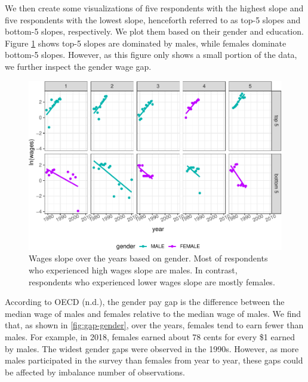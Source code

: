 \documentclass{article}
\begin{document}
We then create some visualizations of five respondents with the highest slope and five respondents with the lowest slope, henceforth referred to as top-5 slopes and bottom-5 slopes, respectively. We plot them based on their gender and education. Figure \ref{fig:slope-gender} shows top-5 slopes are dominated by males, while females dominate bottom-5 slopes. However, as this figure only shows a small portion of the data, we further inspect the gender wage gap.

\begin{figure}

{\centering \includegraphics[width=0.7\linewidth]{figures/slope-gender-1} 

}

\caption{Wages slope over the years based on gender. Most of respondents who experienced high wages slope are males. In contrast, respondents who experienced lower wages slope are mostly females.}\label{fig:slope-gender}
\end{figure}

According to OECD (n.d.), the gender pay gap is the difference between the median wage of males and females relative to the median wage of males. We find that, as shown in \ref{fig:gap-gender}, over the years, females tend to earn fewer than males. For example, in 2018, females earned about 78 cents for every \$1 earned by males. The widest gender gaps were observed in the 1990s. However, as more males participated in the survey than females from year to year, these gaps could be affected by imbalance number of observations.
\end{document}
